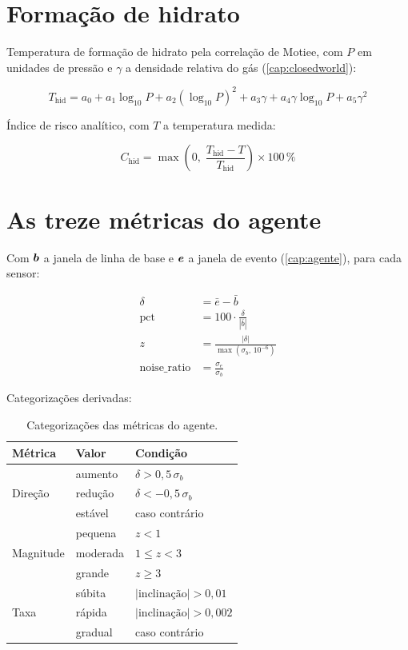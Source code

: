 \section{Formação de hidrato}

Temperatura de formação de hidrato pela correlação de Motiee, com $P$ em unidades de
pressão e $\gamma$ a densidade relativa do gás (\cref{cap:closedworld}):

\begin{equation}
T_{\text{hid}} = a_0 + a_1 \log_{10} P + a_2 (\log_{10} P)^2
+ a_3 \gamma + a_4 \gamma \log_{10} P + a_5 \gamma^2
\label{eq:for-motiee}
\end{equation}

Índice de risco analítico, com $T$ a temperatura medida:

\begin{equation}
C_{\text{hid}} = \max\!\left(0,\;
\frac{T_{\text{hid}} - T}{T_{\text{hid}}}\right) \times 100\,\%
\label{eq:for-chid}
\end{equation}

\section{As treze métricas do agente}

Com $\bm{b}$ a janela de linha de base e $\bm{e}$ a janela de evento
(\cref{cap:agente}), para cada sensor:

\begin{align}
\delta &= \bar{e} - \bar{b}
\label{eq:for-delta} \\[0.3em]
\text{pct} &= 100 \cdot \frac{\delta}{|\bar{b}|}
\label{eq:for-pct} \\[0.3em]
z &= \frac{|\delta|}{\max(\sigma_b,\, 10^{-6})}
\label{eq:for-z} \\[0.3em]
\text{noise\_ratio} &= \frac{\sigma_e}{\sigma_b}
\label{eq:for-noise}
\end{align}

Categorizações derivadas:

\begin{table}[htbp]
\centering
\caption{Categorizações das métricas do agente.}
\label{tab:for-categorias}
\small
\begin{tabular}{llp{6.2cm}}
\toprule
\textbf{Métrica} & \textbf{Valor} & \textbf{Condição} \\
\midrule
\multirow{3}{*}{Direção}
& aumento    & $\delta > 0{,}5\,\sigma_b$ \\
& redução    & $\delta < -0{,}5\,\sigma_b$ \\
& estável    & caso contrário \\
\midrule
\multirow{3}{*}{Magnitude}
& pequena    & $z < 1$ \\
& moderada   & $1 \le z < 3$ \\
& grande     & $z \ge 3$ \\
\midrule
\multirow{3}{*}{Taxa}
& súbita     & $|\text{inclinação}| > 0{,}01$ \\
& rápida     & $|\text{inclinação}| > 0{,}002$ \\
& gradual    & caso contrário \\
\bottomrule
\end{tabular}
\end{table}

